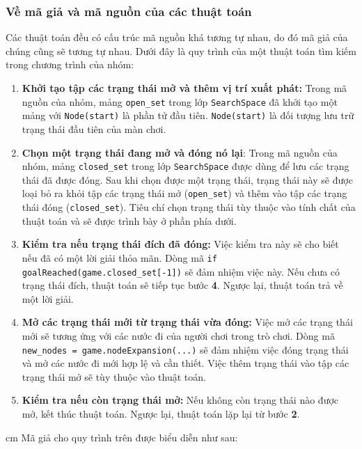 \subsubsection{Về mã giả và mã nguồn của các thuật toán}
Các thuật toán đều có cấu trúc mã nguồn khá tương tự nhau, do đó mã giả của chúng cũng sẽ tương tự nhau. Dưới đây là quy trình của một thuật toán tìm kiếm trong chương trình của nhóm:
\label{algo-struct}
\begin{enumerate}[label=\bfseries\arabic*), labelindent=2em, labelsep=0.3cm, leftmargin=1cm, wide=\parindent, topsep=0.1cm, itemsep=-1ex, partopsep=1.5ex, parsep=1.5ex]
	\item \textbf{Khởi tạo tập các trạng thái mở và thêm vị trí xuất phát:} Trong mã nguồn của nhóm, mảng \verb|open_set| trong lớp \verb|SearchSpace| đã khởi tạo một mảng với \verb|Node(start)| là phần tử đầu tiên. \verb|Node(start)| là đối tượng lưu trữ trạng thái đầu tiên của màn chơi.
	\item \textbf{Chọn một trạng thái đang mở và đóng nó lại}: Trong mã nguồn của nhóm, mảng \verb|closed_set| trong lớp \verb|SearchSpace| được dùng để lưu các trạng thái đã được đóng. Sau khi chọn được một trạng thái, trạng thái này sẽ được loại bỏ ra khỏi tập các trạng thái mở (\verb|open_set|) và thêm vào tập các trạng thái đóng (\verb|closed_set|). Tiêu chí chọn trạng thái tùy thuộc vào tính chất của thuật toán và sẽ được trình bày ở phần phía dưới.
	\item \textbf{Kiểm tra nếu trạng thái đích đã đóng:} Việc kiểm tra này sẽ cho biết nếu đã có một lời giải thỏa mãn. Dòng mã \verb|if goalReached(game.closed_set[-1])| sẽ đảm nhiệm việc này. Nếu chưa có trạng thái đích, thuật toán sẽ tiếp tục bước \textbf{4}. Ngược lại, thuật toán trả về một lời giải.
	\item \textbf{Mở các trạng thái mới từ trạng thái vừa đóng:} Việc mở các trạng thái mới sẽ tương ứng với các nước đi của người chơi trong trò chơi. Dòng mã \verb|new_nodes = game.nodeExpansion(...)| sẽ đảm nhiệm việc đóng trạng thái và mở các nước đi mới hợp lệ và cần thiết. Việc thêm trạng thái vào tập các trạng thái mở sẽ tùy thuộc vào thuật toán.
	\item \textbf{Kiểm tra nếu còn trạng thái mở:} Nếu không còn trạng thái nào được mở, kết thúc thuật toán. Ngược lại, thuật toán lặp lại từ bước \textbf{2}.
\end{enumerate}

 cm
Mã giả cho quy trình trên được biểu diễn như sau:

